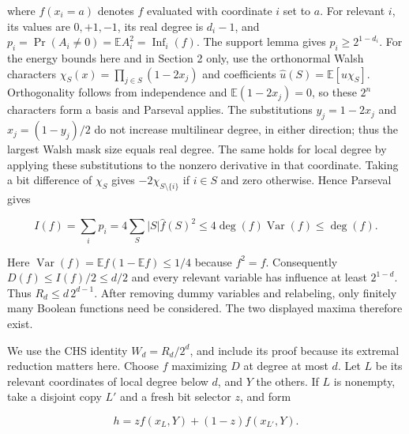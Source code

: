 \documentclass[11pt]{article}
\theoremstyle{remark}
\theoremstyle{correctionstyle}
\begin{document}
\leavevmode\label{src-p009}where $f(x_i{=}a)$ denotes $f$ evaluated with coordinate $i$ set to $a$.
For relevant $i$, its values are $0,+1,-1$, its real degree is $d_i-1$, and
$p_i=\Pr(A_i\ne0)=\mathbb E A_i^2=\operatorname{Inf}_i(f)$.
The support lemma gives $p_i\ge 2^{1-d_i}$.
For the energy bounds here and in Section 2 only, use the orthonormal Walsh
characters $\chi_S(x)=\prod_{j\in S}(1-2x_j)$ and coefficients
$\widehat u(S)=\mathbb E[u\chi_S]$. Orthogonality follows from independence
and $\mathbb E(1-2x_j)=0$, so these $2^n$ characters form a basis and
Parseval applies. The substitutions $y_j=1-2x_j$ and $x_j=(1-y_j)/2$
do not increase multilinear degree, in either direction; thus the largest
Walsh mask size equals real degree. The same holds for local degree by
applying these substitutions to the nonzero derivative in that coordinate.
Taking a bit difference of $\chi_S$ gives $-2\chi_{S\setminus\{i\}}$
if $i\in S$ and zero otherwise. Hence Parseval gives\label{src-end-p009}\par

\begin{equation}
I(f)=\sum_i p_i=4\sum_S |S|\widehat f(S)^2
\le4\deg(f)\operatorname{Var}(f)\le\deg(f).\tag*{}
\label{src-p010}
\end{equation}

\leavevmode\label{src-p011}Here $\operatorname{Var}(f)=\mathbb E f(1-\mathbb E f)\le1/4$ because $f^2=f$.
Consequently $D(f)\le I(f)/2\le d/2$ and every relevant variable has influence
at least $2^{1-d}$. Thus $R_d\le d\,2^{d-1}$. After removing dummy variables and
relabeling, only finitely many Boolean functions need be considered. The
two displayed maxima therefore exist.\label{src-end-p011}\par

\leavevmode\label{src-p012}We use the CHS identity $W_d=R_d/2^d$, and include its proof because its
extremal reduction matters here. Choose $f$ maximizing $D$ at degree at most $d$.
Let $L$ be its relevant coordinates of local degree below $d$, and $Y$ the
others. If $L$ is nonempty, take a disjoint copy $L'$ and a fresh bit selector $z$,
and form\label{src-end-p012}\par

\begin{equation}
h=z f(x_L,Y)+(1-z)f(x_{L'},Y).\tag*{}
\label{src-p013}
\end{equation}
\end{document}
